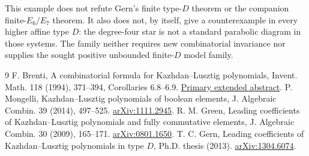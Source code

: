 \documentclass[11pt]{article}
\begin{document}
This example does not refute Gern's finite type-$D$ theorem
\cite[Theorem 4.5.11]{Gern} or the companion finite-$E_6/E_7$ theorem.
It also does not, by itself, give a counterexample in every higher affine
type $D$: the degree-four star is not a standard parabolic diagram in
those systems. The family neither requires new combinatorial invariance
nor supplies the sought positive unbounded finite-$D$ model family.

\begin{thebibliography}{9}
 F. Brenti, A combinatorial formula for Kazhdan--Lusztig
polynomials, Invent. Math. 118 (1994), 371--394, Corollaries 6.8--6.9.
\href{https://fpsac-archive.github.io/FPSAC94/ARTICLES/06Brenti.pdf}{Primary extended abstract}.
 P. Mongelli, Kazhdan--Lusztig polynomials of boolean
elements, J. Algebraic Combin. 39 (2014), 497--525.
\href{https://arxiv.org/abs/1111.2945}{arXiv:1111.2945}.
 R. M. Green, Leading coefficients of Kazhdan--Lusztig
polynomials and fully commutative elements, J. Algebraic Combin. 30 (2009),
165--171. \href{https://arxiv.org/abs/0801.1650}{arXiv:0801.1650}.
 T. C. Gern, Leading coefficients of Kazhdan--Lusztig
polynomials in type $D$, Ph.D. thesis (2013).
\href{https://arxiv.org/abs/1304.6074}{arXiv:1304.6074}.
\end{thebibliography}
\end{document}

